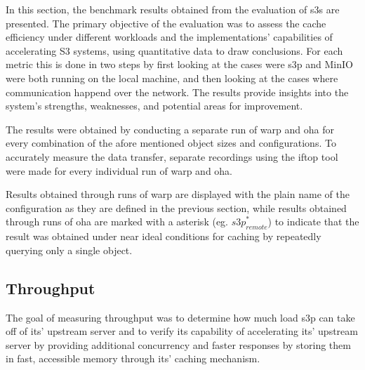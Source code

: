 In this section, the benchmark results obtained from the evaluation of s3s are presented. The primary objective of the evaluation was to assess the cache efficiency under different workloads and the implementations' capabilities of accelerating S3 systems, using quantitative data to draw conclusions. For each metric this is done in two steps by first looking at the cases were s3p and MinIO were both running on the local machine, and then looking at the cases where communication happend over the network. The results provide insights into the system's strengths, weaknesses, and potential areas for improvement.

The results were obtained by conducting a separate run of warp and oha for every combination of the afore mentioned object sizes and configurations. To accurately measure the data transfer, separate recordings using the iftop tool were made for every individual run of warp and oha.

Results obtained through runs of warp are displayed with the plain name of the configuration as they are defined in the previous section, while results obtained through runs of oha are marked with a asterisk (eg. ${s3p}^{*}_{remote}$) to indicate that the result was obtained under near ideal conditions for caching by repeatedly querying only a single object.



\subsection{Throughput}

The goal of measuring throughput was to determine how much load s3p can take off of its' upstream server and to verify its capability of accelerating its' upstream server by providing additional concurrency and faster responses by storing them in fast, accessible memory through its' caching mechanism.

\throughputlocmin
\pgfplotstabletranspose[colnames from=colnames]\Tthroughputlocmin{\throughputlocmin}

